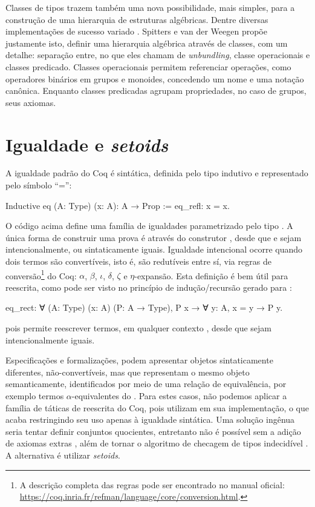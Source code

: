 Classes de tipos trazem também uma nova possibilidade, mais simples, para a construção de uma hierarquia de estruturas algébricas. Dentre diversas implementações de sucesso variado \cite{Geuvers2002,CruzFilipe2004,Garillot2009,Cohen2020}. Spitters e van der Weegen \cite{Spitters2011} propõe justamente isto, definir uma hierarquia algébrica através de classes, com um detalhe: separação entre, no que eles chamam de \textit{unbundling}, classe operacionais e classes predicado. Classes operacionais permitem referenciar operações, como operadores binários em grupos e monoides, concedendo um nome e uma notação canônica. Enquanto classes predicadas agrupam propriedades, no caso de grupos, seus axiomas. 

\section{Igualdade e \textit{setoids}}\label{sec:igualdade}
A igualdade padrão do Coq é sintática, definida pelo tipo indutivo  e representado pelo símbolo ``='':
\begin{coqcode}
Inductive eq (A: Type) (x: A): A → Prop := eq_refl: x = x.	
\end{coqcode}
O código acima define uma família de igualdades parametrizado pelo tipo . A única forma de construir uma prova  é através do construtor , desde que  e  sejam intencionalmente, ou sintaticamente iguais. Igualdade intencional ocorre quando dois termos são convertíveis, isto é, são redutíveis entre sí, via regras de conversão\footnote{A descrição completa das regras pode ser encontrado no manual oficial: \url{https://coq.inria.fr/refman/language/core/conversion.html}.} do Coq: $\alpha$, $\beta$, $\iota$, $\delta$, $\zeta$ e $\eta$-expansão.  Esta definição é bem útil para reescrita, como pode ser visto no princípio de indução/recursão gerado para :
\begin{coqcode}
eq_rect: ∀ (A: Type) (x: A) (P: A → Type), P x → ∀ y: A, x = y → P y.
\end{coqcode}
pois permite reescrever termos, em qualquer contexto , desde que sejam intencionalmente iguais. 

Especificações e formalizações, podem apresentar objetos sintaticamente diferentes, não-convertíveis, mas que representam o mesmo objeto semanticamente, identificados por meio de uma relação de equivalência, por exemplo termos $\alpha$-equivalentes do \lcalc. Para estes casos, não podemos aplicar a família de táticas de reescrita do Coq, pois utilizam  em sua implementação, o que acaba restringindo seu uso apenas à igualdade sintática. Uma solução ingênua seria tentar definir conjuntos quocientes, entretanto não é possível sem a adição de axiomas extras \cite{Chicli2003}, além de tornar o algoritmo de checagem de tipos indecidível \cite{Geuvers2002}. A alternativa é utilizar \textit{setoids}.

